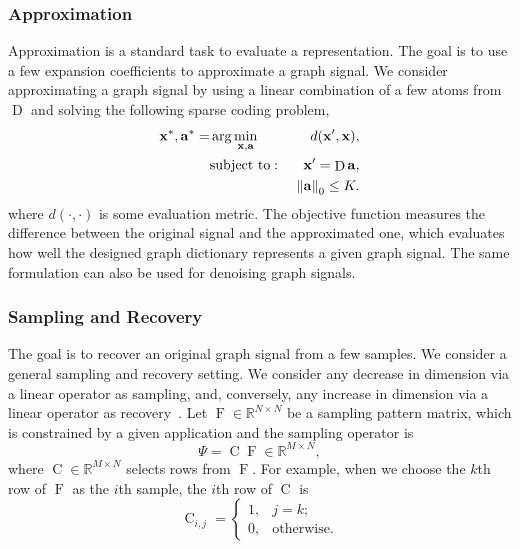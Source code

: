 \documentclass[journal,twocolumn,10pt]{IEEEtran}
\theoremstyle{definition}
\newcommand{\R}{\ensuremath{\mathbb{R}}}
\def\a{\mathbf{a}}
\def\x{\mathbf{x}}
\DeclareMathOperator{\Cc}{C}
\DeclareMathOperator{\D}{D}
\DeclareMathOperator{\F}{F}
\begin{document}
\subsubsection{Approximation}
Approximation is a standard task to evaluate a representation. The goal is to use a few expansion coefficients to approximate a graph signal.  We consider approximating a graph signal by using a linear combination of a few atoms from $\D$ and solving the following sparse coding problem,
\begin{eqnarray}
\label{eq:sparse_coding}
   \x^*, \a^*=  &  \arg \min_{\x, \a} & d(\x', \x ),
   \\
   \nonumber
   & {\rm subject~to:~} & \x' = \D \a, 
   \\
   \nonumber
   && \left\| \a \right\|_0 \leq K.
\end{eqnarray}
where $d(\cdot, \cdot)$ is some evaluation metric. The objective function measures the difference between the original signal and the approximated one, which evaluates how well the designed graph dictionary represents a given graph signal. The same formulation can also be used for denoising graph signals.



\subsubsection{Sampling and Recovery} 
\label{sec:samplingandrecovery}
The goal is to recover an original graph signal from a few samples. We consider a general sampling and recovery setting. We consider any decrease in dimension via a linear operator as sampling, and, conversely, any increase in dimension via a linear operator as recovery~\cite{VetterliKG:12}.  Let $\F \in \R^{N \times N}$ be a sampling pattern matrix, which is constrained by a given application and the sampling operator is 
\begin{equation}
\label{eq:Psi}
\Psi = \Cc \F \in \R^{M \times N},
\end{equation}
where $\Cc \in \R^{M \times N}$ selects rows from $\F$. For example, when we choose the $k$th row of $\F$ as the $i$th sample, the $i$th row of $\Cc$ is
\begin{equation*}
\label{eq:C}
 \Cc_{i,j} = 
  \left\{ 
    \begin{array}{rl}
      1, & j = k;\\
      0, & \mbox{otherwise}.
  \end{array} \right.
\end{equation*}
\end{document}
